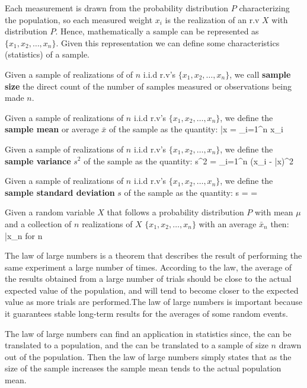 Each measurement is drawn from the probability distribution $P$ characterizing the population, so each measured
weight $x_{i}$ is the realization of an r.v $X$ with distribution $P$. Hence, mathematically a sample can be
represented as $\{ x_{1}, x_{2}, \ldots, x_{n} \}$. Given this representation we can define some characteristics
(statistics) of a sample.

Given a sample of realizations of of $n$ i.i.d r.v's $\{ x_{1}, x_{2}, \ldots, x_{n} \}$, we call \textbf{sample
size} the direct count of the number of samples measured or observations being made $n$.
\ed

Given a sample of realizations of $n$ i.i.d r.v's $\{ x_{1}, x_{2}, \ldots, x_{n} \}$, we define the \textbf{sample
mean} or average $\bar{x}$ of the sample as the quantity:
\bse
\bar{x} =  \sum_{i=1}^{n} x_{i}
\ese
\ed

Given a sample of realizations of $n$ i.i.d r.v's $\{ x_{1}, x_{2}, \ldots, x_{n} \}$, we define the \textbf{sample
variance} $s^2$ of the sample as the quantity:
\bse
s^2 =  \sum_{i=1}^{n} (x_{i} - \bar{x})^2
\ese
\ed

Given a sample of realizations of $n$ i.i.d r.v's $\{ x_{1}, x_{2}, \ldots, x_{n} \}$, we define the \textbf{sample
standard deviation} $s$ of the sample as the quantity:
\bse
s =  = 
\ese
\ed

Given a random variable $X$ that follows a probability distribution $P$ with mean $\mu$ and a collection of $n$
realizations of $X$ $\{ x_{1}, x_{2}, \ldots, x_{n} \}$ with an average $\bar{x}_{n}$ then:
\bse
\bar{x}_{n} \to \mu \:\:\: for \:\:\: n \to \infty
\ese
\et

The law of large numbers is a theorem that describes the result of performing the same experiment a large number of
times. According to the law, the average of the results obtained from a large number of trials should be close to the
actual expected value of the population, and will tend to become closer to the expected value as more trials are
performed.The law of large numbers is important because it guarantees stable long-term results for the averages of
some random events.


The law of large numbers can find an application in statistics since, the  can be translated to a population, and the  can be translated to a sample of
size $n$ drawn out of the population. Then the law of large numbers simply states that as the size of the sample
increases the sample mean tends to the actual population mean.

